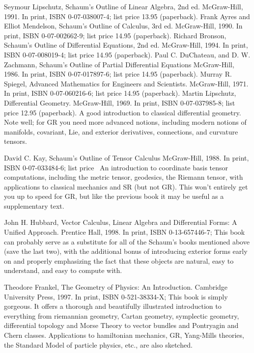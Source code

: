 \documentclass[10pt,a4paper]{book}
\theoremstyle{definition}
\begin{document}
Seymour Lipschutz,
Schaum's Outline of Linear Algebra, 2nd ed.
McGraw-Hill, 1991.
In print, ISBN 0-07-038007-4; list price 13.95 (paperback).
Frank Ayres and Elliot Mendelson,
Schaum's Outline of Calculus, 3rd ed.
McGraw-Hill, 1990.
In print, ISBN 0-07-002662-9; list price 14.95 (paperback).
Richard Bronson,
Schaum's Outline of Differential Equations, 2nd ed.
McGraw-Hill, 1994.
In print, ISBN 0-07-008019-4; list price 14.95 (paperback).
Paul C. DuChateau, and D. W. Zachmann,
Schaum's Outline of Partial Differential Equations
McGraw-Hill, 1986.
In print, ISBN 0-07-017897-6; list price 14.95 (paperback).
Murray R. Spiegel,
Advanced Mathematics for Engineers and Scientists.
McGraw-Hill, 1971.
In print, ISBN 0-07-060216-6; list price 14.95 (paperback).
Martin Lipschutz,
Differential Geometry.
McGraw-Hill, 1969.
In print, ISBN 0-07-037985-8; list price 12.95 (paperback).
A good introduction to classical differential geometry.  Note well; for GR you need more advanced notions, including modern notions of manifolds, covariant, Lie, and exterior derivatives, connections, and curvature tensors.

David C. Kay,
Schaum's Outline of Tensor Calculus
McGraw-Hill, 1988.
In print, ISBN 0-07-033484-6; list price \
An introduction to coordinate basis tensor computations, including the metric tensor, geodesics, the Riemann tensor, with applications to classical mechanics and SR (but not GR).  This won't entirely get you up to speed for GR, but like the previous book it may be useful as a supplementary text.

John H. Hubbard,
Vector Calculus, Linear Algebra and Differential Forms: A Unified Approach.
Prentice Hall, 1998.
In print, ISBN 0-13-657446-7; 
This book can probably serve as a substitute for all of the Schaum's books mentioned above (save the last two), with the additional bonus of introducing exterior forms early on and properly emphasizing the fact that these objects are natural, easy to understand, and easy to compute with.

Theodore Frankel,
The Geometry of Physics: An Introduction.
Cambridge University Press, 1997.
In print, ISBN 0-521-38334-X; 
This book is simply gorgeous.  It offers a thorough and beautifully illustrated introduction to everything from riemannian geometry, Cartan geometry, symplectic geometry, differential topology and Morse Theory to vector bundles and Pontryagin and Chern classes.  Applications to hamiltonian mechanics, GR, Yang-Mills theories, the Standard Model of particle physics, etc., are also sketched.
\end{document}
